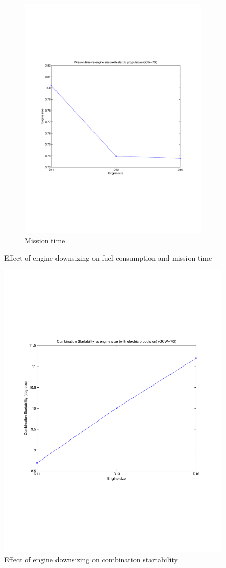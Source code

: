 \documentclass{article}
\begin{document}
\begin{figure}[h!]
\begin{subfigure}{.5\textwidth}
	\includegraphics[width=\linewidth, clip=true, trim=45 185 65 206]{Figures/Engine_downsizing/Mission_time_vs_engine_size_(with_electric_propulsion)(GCW=70t).pdf}
	\caption{Mission time}
\end{subfigure}
\caption{Effect of engine downsizing on fuel consumption and mission time}
\label{fuelTimeEngineDownsize}
\end{figure}

\begin{figure}[h!]
\centering
\includegraphics[width=0.5\linewidth, clip=true, trim=45 185 65 208]{Figures/Engine_downsizing/Combination_startability_vs_engine_size_(with_electric_propulsion).pdf}
\caption{Effect of engine downsizing on combination startability}
\label{startabilityEngineDownsize}
\end{figure}
\end{document}
